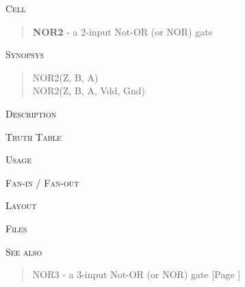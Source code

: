 
\label{NOR2}
\textsc{Cell}
\begin{quote}
    \textbf{NOR2} - a 2-input Not-OR (or NOR) gate
\end{quote}

\textsc{Synopsys}
\begin{quote}
    NOR2(Z, B, A) \\
    NOR2(Z, B, A, Vdd, Gnd)
\end{quote}

\textsc{Description}

%

\textsc{Truth Table}


\textsc{Usage}

\textsc{Fan-in / Fan-out}

\textsc{Layout}

\textsc{Files}

\textsc{See also}
\begin{quote}
    NOR3 - a 3-input Not-OR (or NOR) gate [Page \pageref{NOR3}]
\end{quote}
